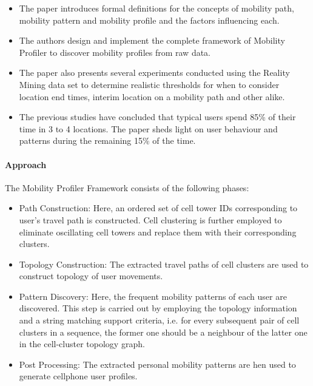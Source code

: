 \begin{itemize}
	
	\item The paper introduces formal definitions for the concepts of mobility path, mobility 
	pattern and mobility profile and the factors influencing each. 
	
	\item The authors design and implement the complete framework of Mobility Profiler to 
	discover mobility profiles from raw data. 
	
	\item The paper also presents several experiments conducted using the Reality Mining data 
	set to determine realistic thresholds for when to consider location end times, interim 
	location on a mobility path and other alike. 
	
	\item The previous studies have concluded that typical users spend 85\% of their time in
	3 to 4 locations. The paper sheds light on user behaviour and patterns during the 
	remaining 15\% of the time. 
	
	 
\end{itemize}

\paragraph{Approach}

The Mobility Profiler Framework consists of the following phases: 

\begin{itemize}

	\item Path Construction: Here, an ordered set of cell tower IDs corresponding to 
	user's travel path is constructed. Cell clustering is further employed to eliminate 
	oscillating cell towers and replace them with their corresponding clusters. 
	
	\item Topology Construction: The extracted travel paths of cell clusters are used to 
	construct topology of user movements. 
	
	\item Pattern Discovery: Here, the frequent mobility patterns of each user are discovered. 
	This step is carried out by employing the topology information and a string matching 
	support criteria, i.e. for every subsequent pair of cell clusters in a sequence, the 
	former one should be a neighbour of the latter one in the cell-cluster topology graph. 
	
	\item Post Processing: The extracted personal mobility patterns are hen used to generate
	cellphone user profiles. 
	 
\end{itemize}


